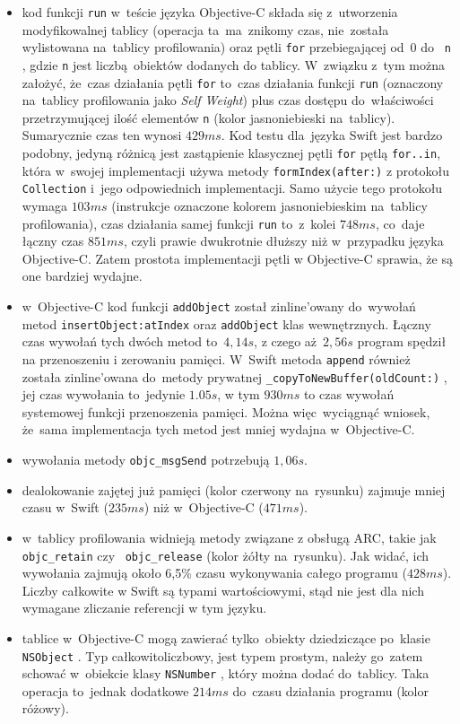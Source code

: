 \documentclass[mgr, shortabstract]{iithesis}
\newcommand{\swiftinline}[1]{
    \texttt{#1}
}
\newcommand{\objcinline}[1]{
    \texttt{#1}
}
\begin{document}
\begin{itemize}
    \item kod funkcji \objcinline{run} w~teście języka Objective-C składa się z~utworzenia modyfikowalnej tablicy (operacja ta~ma~znikomy czas, nie~została wylistowana na~tablicy profilowania) oraz pętli \texttt{for} przebiegającej od~0 do~\objcinline{n}, gdzie \objcinline{n} jest liczbą obiektów dodanych do tablicy. W~związku z~tym można założyć, że~czas działania pętli \texttt{for} to~czas działania funkcji \objcinline{run} (oznaczony na~tablicy profilowania jako \textit{Self Weight}) plus czas dostępu do~właściwości przetrzymującej ilość elementów \objcinline{n} (kolor jasnoniebieski na~tablicy). Sumarycznie czas ten wynosi $429ms$. Kod testu dla~języka Swift jest bardzo podobny, jedyną różnicą jest zastąpienie klasycznej pętli \texttt{for} pętlą \texttt{for..in}, która w~swojej implementacji używa metody \swiftinline{formIndex(after:)} z protokołu \swiftinline{Collection} i~jego odpowiednich implementacji. Samo użycie tego protokołu wymaga $103ms$ (instrukcje oznaczone kolorem jasnoniebieskim na~tablicy profilowania), czas działania samej funkcji \swiftinline{run} to~z~kolei $748ms$, co~daje łączny czas $851ms$, czyli prawie dwukrotnie dłuższy niż w~przypadku języka Objective-C. Zatem prostota implementacji pętli w Objective-C sprawia, że są one bardziej wydajne.
    \item w~Objective-C kod funkcji \objcinline{addObject} został zinline'owany do~wywołań metod \objcinline{insertObject:atIndex} oraz \objcinline{addObject} klas wewnętrznych. Łączny czas wywołań tych dwóch metod to~$4,14s$, z czego aż $2,56s$ program spędził na przenoszeniu i zerowaniu pamięci. W~Swift metoda \swiftinline{append} również została zinline'owana do~metody prywatnej \swiftinline{_copyToNewBuffer(oldCount:)}, jej czas wywołania to~jedynie $1.05s$, w tym $930ms$ to czas wywołań systemowej funkcji przenoszenia pamięci. Można więc~wyciągnąć wniosek, że~sama implementacja tych metod jest mniej wydajna w~Objective-C.
    \item wywołania metody \objcinline{objc_msgSend} potrzebują $1,06s$.
    \item dealokowanie zajętej już pamięci (kolor czerwony na~rysunku) zajmuje mniej czasu w~Swift ($235ms$) niż w~Objective-C ($471ms$).
    \item w~tablicy profilowania widnieją metody związane z obsługą ARC, takie jak \objcinline{objc_retain} czy~\objcinline{objc_release} (kolor żółty na~rysunku). Jak widać, ich wywołania zajmują około 6,5\% czasu wykonywania całego programu ($428ms$). Liczby całkowite w Swift są typami wartościowymi, stąd nie jest dla nich wymagane zliczanie referencji w tym języku.
    \item tablice w~Objective-C mogą zawierać tylko~obiekty dziedziczące po~klasie \objcinline{NSObject}. Typ całkowitoliczbowy, jest typem prostym, należy go~zatem schować w~obiekcie klasy \objcinline{NSNumber}, który można dodać do~tablicy. Taka operacja to~jednak dodatkowe $214ms$ do~czasu działania programu (kolor różowy).
\end{itemize}
\end{document}

